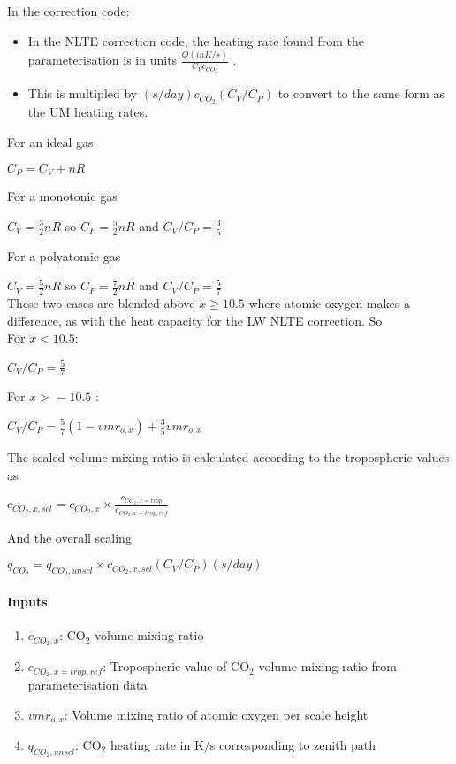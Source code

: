    In the correction code:
   \begin{itemize}
   \item In the NLTE correction code, the heating rate found from the
     parameterisation is in units $\frac{Q(in K/s)}{C_V c_{CO_2}}$ . 
   \item This is multipled by $(s/day) c_{CO_2}(C_V/C_P)$ to convert to 
     the same form as the UM heating rates.
   \end{itemize}

   For an ideal gas

   \noindent $C_P = C_V + nR$

   \noindent For a monotonic gas

   \noindent $C_V = \frac{3}{2} nR$ so $C_P = \frac{5}{2} nR$ and $C_V/C_P = \frac{3}{5}$ 
   
   \noindent For a polyatomic gas
   
   \noindent $C_V = \frac{5}{2} nR$ so $C_P = \frac{7}{2} nR$ and $C_V/C_P = \frac{5}{7}$ \\

   These two cases are blended above $x \geq 10.5$ where atomic oxygen
   makes a difference, as with the heat capacity for the LW NLTE
   correction. So \\
   For  $x < 10.5$:

   \noindent $C_V/C_P = \frac{5}{7}$

   \noindent For $x >= 10.5$ :
   
   \noindent $C_V/C_P = \frac{5}{7} (1 - vmr_{o,x}) + \frac{3}{5} vmr_{o,x}$

   The scaled volume mixing ratio is calculated according to the 
   tropospheric values as

   \noindent $c_{CO_2, x, scl} = c_{CO_2, x} \times \frac{c_{CO_2, x=trop}}{c_{CO_2, x=trop, ref}}$
   
   \noindent And the overall scaling

   \noindent $q_{CO_2} = q_{CO_2, unscl} \times c_{CO_2, x, scl} (C_V/C_P) (s/day)$

   \paragraph{Inputs}
   \begin{enumerate}
   \item $c_{CO_2, x}$: CO$_2$ volume mixing ratio
   \item $c_{CO_2, x=trop, ref}$: Tropospheric value of CO$_2$ volume mixing ratio from parameterisation data 
   \item $vmr_{o,x}$: Volume mixing ratio of atomic oxygen per scale height
   \item $q_{CO_2, unscl}$: CO$_2$ heating rate in K/s corresponding to zenith path
   \end{enumerate}

